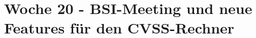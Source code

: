 \section{Woche 20 - BSI-Meeting und neue Features für den CVSS-Rechner} \label{sec:bericht-wo-20}






